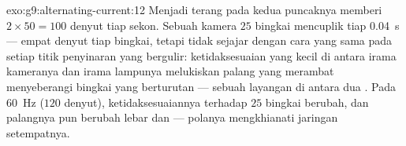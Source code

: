 \begin{solution}{exo:g9:alternating-current:12}
Menjadi terang pada kedua puncaknya memberi $2 \times 50 = 100$ denyut
tiap sekon. Sebuah kamera $25$ bingkai mencuplik tiap
\qty{0.04}{s} --- empat denyut tiap bingkai, tetapi tidak sejajar
dengan cara yang sama pada setiap titik penyinaran yang bergulir:
ketidaksesuaian yang kecil di antara irama kameranya dan irama lampunya
melukiskan palang yang merambat menyeberangi bingkai yang berturutan
--- sebuah layangan di antara dua . Pada \qty{60}{Hz} ($120$
denyut), ketidaksesuaiannya terhadap $25$ bingkai berubah, dan
palangnya pun berubah lebar dan  --- polanya mengkhianati
jaringan setempatnya.
\end{solution}

